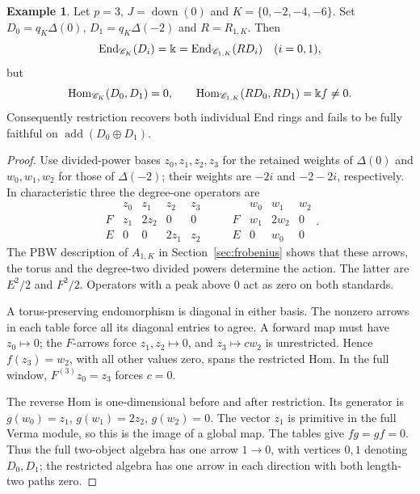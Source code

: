 \documentclass[11pt,reqno]{amsart}
\newcommand{\kk}{\Bbbk}\newcommand{\ZZ}{\mathbb Z}\newcommand{\NN}{\mathbb N}
\newcommand{\Hom}{\operatorname{Hom}}\newcommand{\End}{\operatorname{End}}\newcommand{\Ext}{\operatorname{Ext}}
\newcommand{\add}{\operatorname{add}}\newcommand{\im}{\operatorname{im}}\newcommand{\coker}{\operatorname{coker}}\newcommand{\rad}{\operatorname{rad}}
\theoremstyle{definition}
\newtheorem{example}[theorem]{Example}
\theoremstyle{remark}
\numberwithin{equation}{section}
\begin{document}
\begin{example}\label{ex:mixed}
Let $p=3$, $J=\operatorname{down}(0)$ and $K=\{0,-2,-4,-6\}$.
Set $D_0=q_K\Delta(0)$, $D_1=q_K\Delta(-2)$ and $R=R_{1,K}$.
Then
\[
 \End_{\CC_K}(D_i)=\kk
       =\End_{\CC_{1,K}}(RD_i)\quad(i=0,1),
\]
but
\[
 \Hom_{\CC_K}(D_0,D_1)=0,\qquad
 \Hom_{\CC_{1,K}}(RD_0,RD_1)=\kk f\ne0.
\]
Consequently restriction recovers both individual End rings and fails
to be fully faithful on $\add(D_0\oplus D_1)$.
\end{example}
\begin{proof}
Use divided-power bases $z_0,z_1,z_2,z_3$ for the retained weights of
$\Delta(0)$ and $w_0,w_1,w_2$ for those of $\Delta(-2)$;
their weights are $-2i$ and $-2-2i$, respectively.
In characteristic three the degree-one operators are
\[
 \begin{array}{c|rrrr}
 &z_0&z_1&z_2&z_3\\\hline
 F&z_1&2z_2&0&0\\
 E&0&0&2z_1&z_2
 \end{array}
 \qquad
 \begin{array}{c|rrr}
 &w_0&w_1&w_2\\\hline
 F&w_1&2w_2&0\\
 E&0&w_0&0
 \end{array}.
\]
The PBW description of
$A_{1,K}$ in Section~\ref{sec:frobenius} shows that these arrows,
the torus and the degree-two divided powers determine the action.
The latter are $E^2/2$ and $F^2/2$. Operators with a peak above $0$
act as zero on both standards.

A torus-preserving endomorphism is diagonal in either basis. The
nonzero arrows in each table force all its diagonal entries to agree.
A forward map must have $z_0\mapsto0$; the $F$-arrows force
$z_1,z_2\mapsto0$, and $z_3\mapsto cw_2$ is unrestricted. Hence
$f(z_3)=w_2$, with all other values zero, spans the restricted Hom.
In the full window, $F^{(3)}z_0=z_3$ forces $c=0$.

The reverse Hom is one-dimensional before and
after restriction. Its generator is
$g(w_0)=z_1$, $g(w_1)=2z_2$, $g(w_2)=0$. The vector $z_1$ is
primitive in the full Verma module, so this is the image of a global
map. The tables give $fg=gf=0$. Thus the full two-object algebra has
one arrow $1\to0$, with vertices $0,1$ denoting $D_0,D_1$;
the restricted algebra has one arrow
in each direction with both length-two paths zero.
\end{proof}

\end{document}
